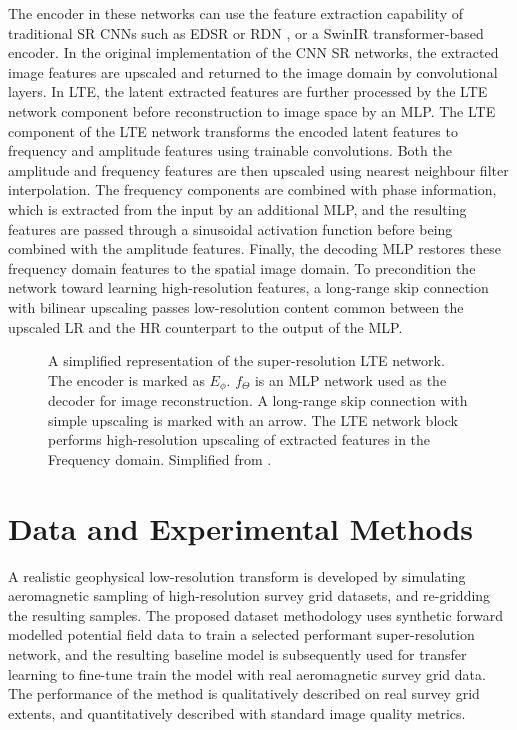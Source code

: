 \documentclass[manuscript.tex]{subfiles}
\begin{document}
The encoder in these networks can use the feature extraction capability of traditional SR CNNs such as EDSR \parencite{limEnhancedDeepResidual2017} or RDN \parencite{zhangResidualDenseNetwork2018}, or a SwinIR \parencite{liangSwinIRImageRestoration2021} transformer-based encoder.
In the original implementation of the CNN SR networks, the extracted image features are upscaled and returned to the image domain by convolutional layers.
In LTE, the latent extracted features are further processed by the LTE network component before reconstruction to image space by an MLP\@.
The LTE component of the LTE network transforms the encoded latent features to frequency and amplitude features using trainable convolutions.
Both the amplitude and frequency features are then upscaled using nearest neighbour filter interpolation.
The frequency components are combined with phase information, which is extracted from the input by an additional MLP, and the resulting features are passed through a sinusoidal activation function before being combined with the amplitude features.
Finally, the decoding MLP restores these frequency domain features to the spatial image domain.
To precondition the network toward learning high-resolution features, a long-range skip connection with bilinear upscaling passes low-resolution content common between the upscaled LR and the HR counterpart to the output of the MLP\@.

\begin{figure}[hbt]
    \caption[The LTE network]{
        A simplified representation of the super-resolution LTE network.
        The encoder is marked as \(E_\phi{}\).
        \(f_\Theta{}\) is an MLP network used as the decoder for image reconstruction.
        A long-range skip connection with simple upscaling is marked with an arrow.
        The LTE network block performs high-resolution upscaling of extracted features in the Frequency domain.
        Simplified from \textcite{leeLocalTextureEstimator2022}.
    }
    \label{fig:ltenet}
\end{figure}


\section{Data and Experimental Methods}
A realistic geophysical low-resolution transform is developed by simulating aeromagnetic sampling of high-resolution survey grid datasets, and re-gridding the resulting samples.
The proposed dataset methodology uses synthetic forward modelled potential field data to train a selected performant super-resolution network, and the resulting baseline model is subsequently used for transfer learning to fine-tune train the model with real aeromagnetic survey grid data.
The performance of the method is qualitatively described on real survey grid extents, and quantitatively described with standard image quality metrics.
\end{document}
